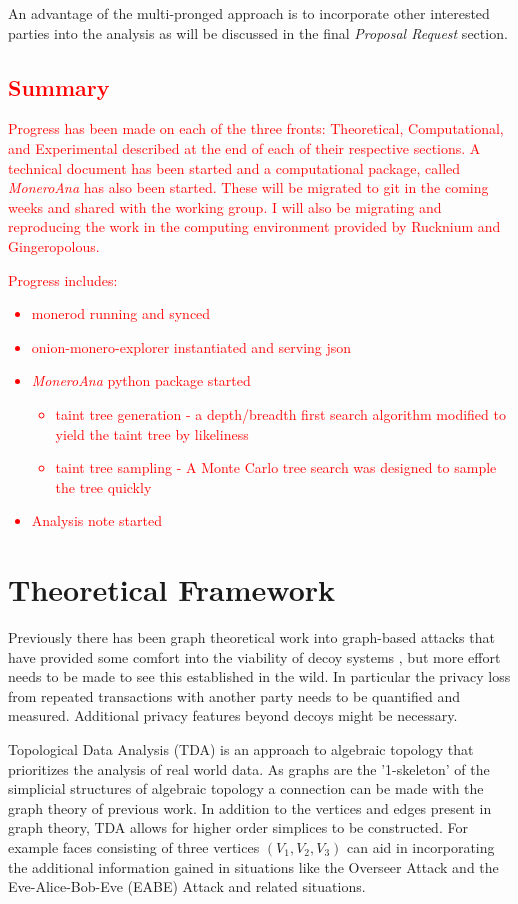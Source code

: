 \documentclass[prc, 12pt]{revtex4-1}
\begin{document}
An advantage of the multi-pronged approach is to incorporate other interested parties into the analysis as will be discussed in the final \textit{Proposal Request} section.

\textcolor{red}{
\subsection{Summary}
Progress has been made on each of the three fronts: Theoretical, Computational, and Experimental described at the end of each of their respective sections.  A technical document has been started and a computational package, called \textit{MoneroAna} has also been started.  These will be migrated to git in the coming weeks and shared with the working group.  I will also be migrating and reproducing the work in the computing environment provided by Rucknium and Gingeropolous. 
}

\textcolor{red}{
Progress includes:
\begin{itemize}
  \item monerod running and synced
  \item onion-monero-explorer instantiated and serving json
  \item \textit{MoneroAna} python package started 
     \begin{itemize}
     \item taint tree generation - a depth/breadth first search algorithm modified to yield the taint tree by likeliness
     \item taint tree sampling - A Monte Carlo tree search was designed to sample the tree quickly
     \end{itemize}
  \item Analysis note started
\end{itemize}}


\section{Theoretical Framework}
Previously there has been graph theoretical work into graph-based attacks that have provided some comfort into the viability of decoy systems \cite{egger2022defeating, vijayakumaran2021analysis}, but more effort needs to be made to see this established in the wild.  In particular the privacy loss from repeated transactions with another party needs to be quantified and measured.  Additional privacy features beyond decoys might be necessary.  

Topological Data Analysis (TDA) is an approach to algebraic topology that prioritizes the analysis of real world data.  \cite{rabadan2019topological, carlsson2009topology}  As graphs are the '1-skeleton' of the simplicial structures of algebraic topology a connection can be made with the graph theory of previous work.  In addition to the vertices and edges present in graph theory, TDA allows for higher order simplices to be constructed.  For example faces consisting of three vertices $(V_1, V_2, V_3)$ can aid in incorporating the additional information gained in situations like the Overseer Attack and the Eve-Alice-Bob-Eve (EABE) Attack and related situations.
\end{document}
